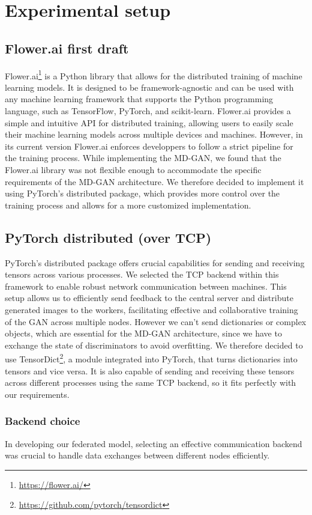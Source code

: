 \chapter{Experimental setup}
\section{Flower.ai first draft}
Flower.ai\footnote{\url{https://flower.ai/}} is a Python library that allows for the distributed training of machine learning models. It is designed to be framework-agnostic and can be used with any machine learning framework that supports the Python programming language, such as TensorFlow, PyTorch, and scikit-learn. Flower.ai provides a simple and intuitive API for distributed training, allowing users to easily scale their machine learning models across multiple devices and machines. However, in its current version Flower.ai enforces developpers to follow a strict pipeline for the training process. While implementing the MD-GAN, we found that the Flower.ai library was not flexible enough to accommodate the specific requirements of the MD-GAN architecture. We therefore decided to implement it using PyTorch's distributed package, which provides more control over the training process and allows for a more customized implementation.

\section{PyTorch distributed (over TCP)}
PyTorch's distributed package offers crucial capabilities for sending and receiving tensors across various processes. We selected the TCP backend within this framework to enable robust network communication between machines. This setup allows us to efficiently send feedback to the central server and distribute generated images to the workers, facilitating effective and collaborative training of the GAN across multiple nodes. However we can't send dictionaries or complex objects, which are essential for the MD-GAN architecture, since we have to exchange the state of discriminators to avoid overfitting. We therefore decided to use TensorDict\footnote{\url{https://github.com/pytorch/tensordict}}, a module integrated into PyTorch, that turns dictionaries into tensors and vice versa. It is also capable of sending and receiving these tensors across different processes using the same TCP backend, so it fits perfectly with our requirements.

\subsection{Backend choice}
In developing our federated model, selecting an effective communication backend was crucial to handle data exchanges between different nodes efficiently. 

